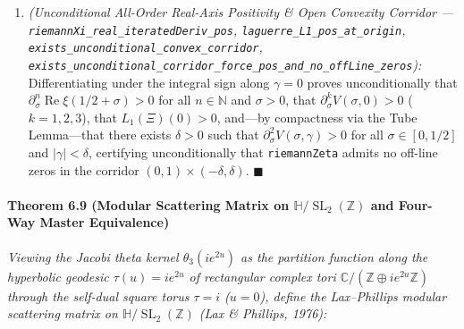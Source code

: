\documentclass[
  11pt,
]{article}
\begin{document}
\begin{enumerate}
  \[\texttt{XiTransverseJerkPos} \;\Longrightarrow\; \texttt{XiTransverseHessianPos} \;\Longrightarrow\; \texttt{XiTransverseForcePos} \;\Longrightarrow\; \texttt{XiModulusStrictMono} \;\Longrightarrow\; \texttt{RiemannHypothesis}.\]

  Conversely, for any finite family of real zeros \(\{r_j\}\), the
  squared modulus \(P(\sigma) = \prod_j ((\gamma - r_j)^2 + \sigma^2)\)
  is proved via the Leibniz rule to satisfy
  \(\partial_\sigma^n P(\sigma) \ge 0\) for every \(n \in \mathbb{N}\)
  and \(\sigma \ge 0\)
  (\texttt{finite\_real\_zero\_product\_iteratedDeriv\_nonneg}).
\item
  \emph{(Unconditional All-Order Real-Axis Positivity \& Open Convexity
  Corridor --- \texttt{riemannXi\_real\_iteratedDeriv\_pos},
  \texttt{laguerre\_L1\_pos\_at\_origin},
  \texttt{exists\_unconditional\_convex\_corridor},
  \texttt{exists\_unconditional\_corridor\_force\_pos\_and\_no\_offLine\_zeros}):}
  Differentiating under the integral sign along \(\gamma = 0\) proves
  unconditionally that
  \(\partial_\sigma^n \operatorname{Re}\xi(1/2 + \sigma) > 0\) for all
  \(n \in \mathbb{N}\) and \(\sigma > 0\), that
  \(\partial_\sigma^k V(\sigma, 0) > 0\) (\(k = 1, 2, 3\)), that
  \(L_1(\Xi)(0) > 0\), and---by compactness via the Tube Lemma---that
  there exists \(\delta > 0\) such that
  \(\partial_\sigma^2 V(\sigma, \gamma) > 0\) for all
  \(\sigma \in [0, 1/2]\) and \(|\gamma| < \delta\), certifying
  unconditionally that \texttt{riemannZeta} admits no off-line zeros in
  the corridor \((0, 1) \times (-\delta, \delta)\). \(\blacksquare\)
\end{enumerate}

\paragraph{\texorpdfstring{Theorem 6.9 (Modular Scattering Matrix on
\(\mathbb{H}/\operatorname{SL}_2(\mathbb{Z})\) and Four-Way Master
Equivalence)}{Theorem 6.9 (Modular Scattering Matrix on \textbackslash mathbb\{H\}/\textbackslash operatorname\{SL\}\_2(\textbackslash mathbb\{Z\}) and Four-Way Master Equivalence)}}\label{theorem-6.9-modular-scattering-matrix-on-mathbbhoperatornamesl_2mathbbz-and-four-way-master-equivalence}

\emph{Viewing the Jacobi theta kernel \(\theta_3(i e^{2u})\) as the
partition function along the hyperbolic geodesic \(\tau(u) = i e^{2u}\)
of rectangular complex tori
\(\mathbb{C}/(\mathbb{Z} \oplus i e^{2u}\mathbb{Z})\) through the
self-dual square torus \(\tau = i\) (\(u = 0\)), define the
Lax--Phillips modular scattering matrix on
\(\mathbb{H}/\operatorname{SL}_2(\mathbb{Z})\) (Lax \& Phillips, 1976):}
\end{document}

